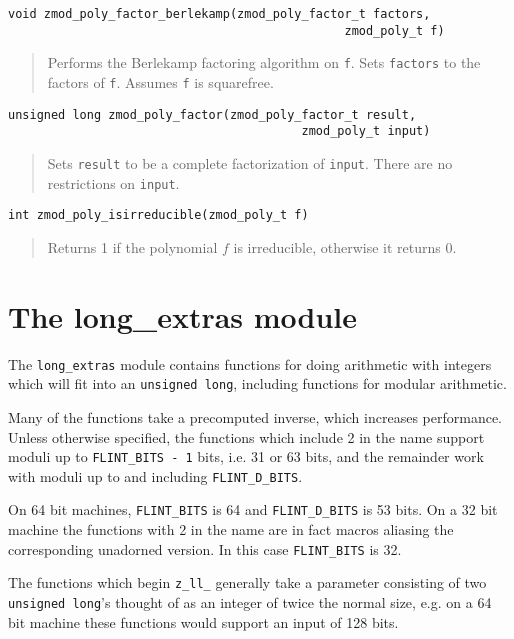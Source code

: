 \documentclass[a4paper,10pt]{article}
\newcommand{\code}{\lstinline}
\begin{document}
\begin{lstlisting}
void zmod_poly_factor_berlekamp(zmod_poly_factor_t factors,
                                               zmod_poly_t f)
\end{lstlisting}
\begin{quote}
Performs the Berlekamp factoring algorithm on \code{f}.  Sets \code{factors} to the factors of \code{f}.  Assumes \code{f} is squarefree.  
\end{quote}

\begin{lstlisting}
unsigned long zmod_poly_factor(zmod_poly_factor_t result,
                                         zmod_poly_t input)
\end{lstlisting}
\begin{quote}
Sets \code{result} to be a complete factorization of \code{input}.  There are no restrictions on \code{input}.
\end{quote}

\begin{lstlisting}
int zmod_poly_isirreducible(zmod_poly_t f) 
\end{lstlisting}
\begin{quote}
Returns 1 if the polynomial $f$ is irreducible, otherwise it returns 0.
\end{quote}

\section{The long\_extras module}
The \code{long_extras} module contains functions for doing arithmetic with integers which will fit into an \code{unsigned long}, including functions for modular arithmetic.

Many of the functions take a precomputed inverse, which increases performance. Unless otherwise specified, the functions which include 2 in the name support moduli up to \code{FLINT_BITS - 1} bits, i.e. 31 or 63 bits, and the remainder work with moduli up to and including \code{FLINT_D_BITS}. 

On 64 bit machines, \code{FLINT_BITS} is 64 and \code{FLINT_D_BITS} is 53 bits. On a 32 bit machine the functions with 2 in the name are in fact macros aliasing the corresponding unadorned version. In this case \code{FLINT_BITS} is 32.

The functions which begin \code{z_ll_} generally take a parameter consisting of two \code{unsigned long}'s thought of as an integer of twice the normal size, e.g. on a 64 bit machine these functions would support an input of 128 bits.
\end{document}
